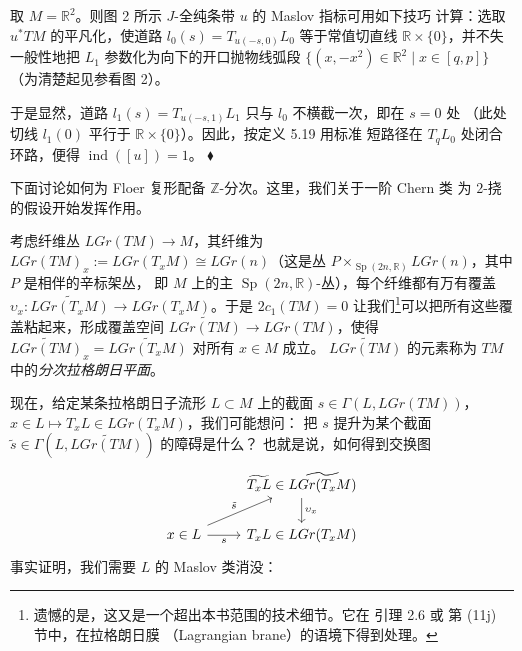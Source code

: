 \begin{Ex}\label{ex:5.20}
取 $M=\mathbb R^2$。则图 2 所示 $J$-全纯条带 $u$ 的 Maslov 指标可用如下技巧
计算：选取 $u^*TM$ 的平凡化，使道路 $l_0(s)=T_{u(-s,0)}L_0$ 等于常值切直线
$\mathbb R\times\{0\}$，并不失一般性地把 $L_1$ 参数化为向下的开口抛物线弧段
$\{(x,-x^2)\in\mathbb R^2\mid x\in[q,p]\}$（为清楚起见参看图 2）。

于是显然，道路 $l_1(s)=T_{u(-s,1)}L_1$ 只与 $l_0$ 不横截一次，即在 $s=0$ 处
（此处切线 $l_1(0)$ 平行于 $\mathbb R\times\{0\}$）。因此，按定义 5.19 用标准
短路径在 $T_qL_0$ 处闭合环路，便得 $\operatorname{ind}([u])=1$。
\hfill$\blacklozenge$
\end{Ex}

下面讨论如何为 Floer 复形配备 $\mathbb Z$-分次。这里，我们关于一阶 Chern 类
为 $2$-挠的假设开始发挥作用。

考虑纤维丛 $LGr(TM)\to M$，其纤维为
$LGr(TM)_x:=LGr(T_xM)\cong LGr(n)$（这是丛
$P\times_{\operatorname{Sp}(2n,\mathbb R)}LGr(n)$，其中 $P$ 是相伴的辛标架丛，
即 $M$ 上的主 $\operatorname{Sp}(2n,\mathbb R)$-丛），每个纤维都有万有覆盖
$\upsilon_x:\widetilde{LGr(T_xM)}\to LGr(T_xM)$。于是 $2c_1(TM)=0$ 让我们\footnote{遗憾的是，这又是一个超出本书范围的技术细节。它在
\cite{Fuk02b} 引理 2.6 或 \cite{Sei08} 第 (11j) 节中，在拉格朗日膜
（Lagrangian brane）的语境下得到处理。}可以把所有这些覆盖粘起来，形成覆盖空间
$\widetilde{LGr(TM)}\to LGr(TM)$，使得
$\widetilde{LGr(TM)}_x=\widetilde{LGr(T_xM)}$ 对所有 $x\in M$ 成立。
$\widetilde{LGr(TM)}$ 的元素称为 $TM$ 中的\emph{分次拉格朗日平面}。

现在，给定某条拉格朗日子流形 $L\subset M$ 上的截面
$s\in\Gamma(L,LGr(TM))$，$x\in L\mapsto T_xL\in LGr(T_xM)$，我们可能想问：
把 $s$ 提升为某个截面 $\tilde s\in\Gamma(L,\widetilde{LGr(TM)})$ 的障碍是什么？
也就是说，如何得到交换图
\begin{equation}
\begin{tikzcd}
& \widetilde{T_xL}\in\widetilde{LGr(T_xM)} \arrow[d,"\upsilon_x"] \\
x\in L \arrow[ur,"\tilde s"] \arrow[r,"s"'] & T_xL\in LGr(T_xM)
\end{tikzcd}
\label{eq:5.62}
\end{equation}
事实证明，我们需要 $L$ 的 Maslov 类消没：

